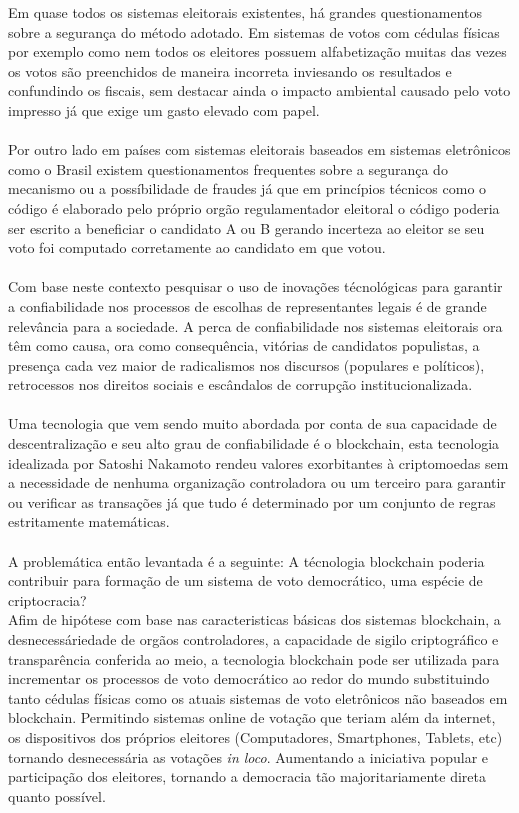 Em quase todos os sistemas eleitorais existentes, há grandes questionamentos sobre
a segurança do método adotado. Em sistemas de votos com cédulas físicas por exemplo
como nem todos os eleitores possuem alfabetização muitas das vezes os votos são
preenchidos de maneira incorreta inviesando os resultados e confundindo os fiscais, 
sem destacar ainda o impacto ambiental causado pelo voto impresso já que exige
um gasto elevado com papel.\\ \\
Por outro lado em países com sistemas eleitorais baseados em sistemas eletrônicos
como o Brasil existem questionamentos frequentes sobre a segurança do mecanismo 
ou a possíbilidade de fraudes já que em princípios técnicos como o código é elaborado
pelo próprio orgão regulamentador eleitoral o código poderia ser escrito a 
beneficiar o candidato A ou B gerando incerteza ao eleitor se seu voto
foi computado corretamente ao candidato em que votou. \\ \\
Com base neste contexto pesquisar o uso de inovações técnológicas para garantir a 
confiabilidade nos processos de escolhas de representantes legais é de grande relevância
para a sociedade. A perca de confiabilidade nos sistemas eleitorais ora têm como
causa, ora como consequência, vitórias de candidatos populistas, a presença cada
vez maior de radicalismos nos discursos (populares e políticos), retrocessos nos
direitos sociais e escândalos de corrupção institucionalizada. \\ \\
Uma tecnologia que vem sendo muito abordada por conta de sua capacidade de 
descentralização e seu alto grau de confiabilidade é o blockchain, esta tecnologia
idealizada por Satoshi Nakamoto \cite[Bitcoin P2P e-cash paper]{nakamoto2008re}
rendeu valores exorbitantes à criptomoedas sem a necessidade de nenhuma organização
controladora ou um terceiro para garantir ou verificar as transações já que tudo
é determinado por um conjunto de regras estritamente matemáticas. \\ \\
A problemática então levantada é a seguinte: A técnologia blockchain poderia contribuir
para formação de um sistema de voto democrático, uma espécie de criptocracia? \\ 
Afim de hipótese com base nas caracteristicas básicas dos sistemas blockchain, 
a desnecessáriedade de orgãos controladores, a capacidade de sigilo criptográfico
e transparência conferida ao meio, a tecnologia blockchain pode ser
utilizada para incrementar os processos de voto democrático ao redor do mundo 
substituindo tanto cédulas físicas como os atuais sistemas de voto eletrônicos 
não baseados em blockchain. Permitindo sistemas online de votação que teriam 
além da internet, os dispositivos dos próprios eleitores (Computadores, Smartphones, 
Tablets, etc) tornando desnecessária as votações  \textit{in loco}. Aumentando a
iniciativa popular e participação dos eleitores, tornando a democracia tão 
majoritariamente direta quanto possível. \\ \\
